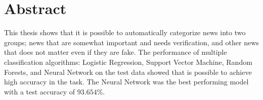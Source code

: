 \chapter*{Abstract}
\makeabstract


This thesis shows that it is possible to automatically categorize news into two groups; news that are somewhat important and needs verification, and other news that does not matter even if they are fake. The performance of multiple classification algorithms: Logistic Regression, Support Vector Machine, Random Forests, and Neural Network on the test data showed that is possible to achieve high accuracy in the task. The Neural Network was the best performing model with a test accuracy of $93.654\%$.


\abstractsig
